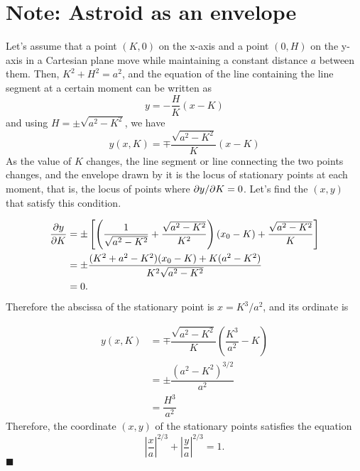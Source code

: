 \documentclass[twocolumn]{article}
\begin{document}
\section*{Note: Astroid as an envelope}
Let's assume that a point $(K, 0)$ on the x-axis and a point $(0, H)$ on the y-axis in a Cartesian plane move while maintaining a constant distance $a$ between them. Then, $K^2+H^2=a^2$, and the equation of the line containing the line segment at a certain moment can be written as
$$y=-\dfrac{H}{K}(x-K)$$
and using $H=\pm \sqrt{a^2-K^2}$, we have
$$y(x, K) = \mp \dfrac{\sqrt{a^2-K^2}}{K}(x-K)$$
As the value of $K$ changes, the line segment or line connecting the two points changes, and the envelope drawn by it is the locus of stationary points at each moment, that is, the locus of points where ${{\partial y}/{\partial K}} = 0$. Let's find the $(x, y)$ that satisfy this condition.

$$ \begin{aligned}
	{\frac{\partial y}{\partial K}} &= \pm\left[\left( \dfrac{1}{\sqrt{a^2-K^2}}+\dfrac{\sqrt{a^2-K^2}}{K^2}\right) (x_{0}-K) + \dfrac{\sqrt{a^2-K^2}}{K} \right]\\
	&= \pm \dfrac{(K^2+a^2-K^2)(x_{0}-K)+K(a^2-K^2)}{K^2\sqrt{a^2-K^2}}\\
	&= 0.
\end{aligned}
$$
Therefore the abscissa of the stationary point is $x = K^3/a^2$, and its ordinate is

$$ \begin{aligned}
	y(x, K) &= \mp \dfrac{\sqrt{a^2-K^2}}{K}\left(\dfrac{K^3}{a^2}-K\right)\\
	& = \pm \dfrac{\left( a^2- K^2 \right)^{3/2}}{a^2}\\
	& = \dfrac{H^3}{a^2}
\end{aligned}
$$
Therefore, the coordinate $(x, y)$ of the stationary points satisfies the equation
$$ \left|\dfrac{x}{a}\right|^{2/3} + \left|\dfrac{y}{a}\right|^{2/3} = 1. $$
$\blacksquare$
\end{document}
